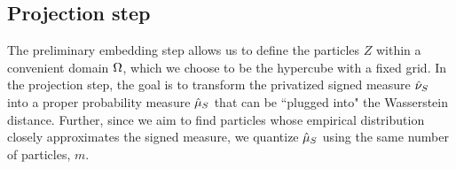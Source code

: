 \subsection{Projection step}
\label{sec:projection}

The preliminary embedding step allows us to define the particles $Z$ within a convenient domain $\Omega$, which we choose to be the hypercube with a fixed grid. In the projection step, the goal is to transform the privatized signed measure $\hat \nu_{S}$ into a proper probability measure $\hat \mu_{S}$ that can be ``plugged into" the Wasserstein distance. Further, since we aim to find particles whose empirical distribution closely approximates the signed measure, we quantize $\hat \mu_{S}$ using the same number of particles, $m$.

